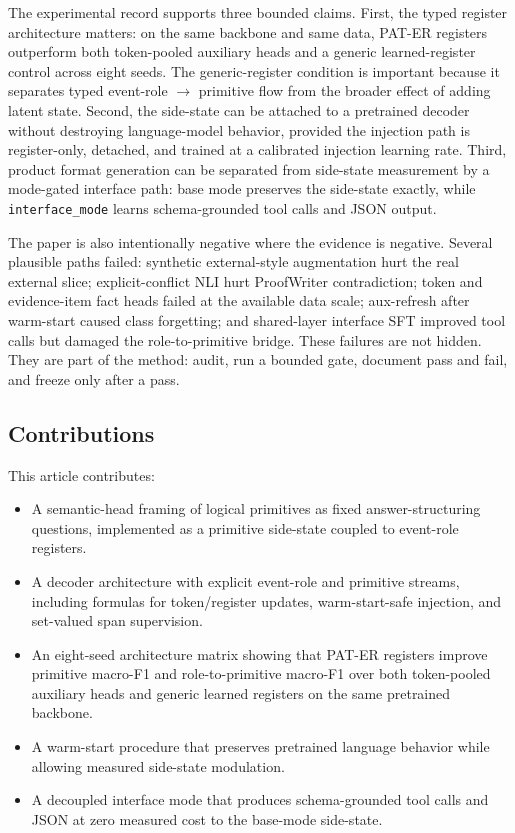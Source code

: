 The experimental record supports three bounded claims. First, the typed
register architecture matters: on the same \Qwen{} backbone and same data,
PAT-ER registers outperform both token-pooled auxiliary heads and a generic
learned-register control across eight seeds. The generic-register condition is
important because it separates typed event-role $\rightarrow$ primitive flow
from the broader effect of adding latent state. Second, the side-state can be
attached to a pretrained decoder without destroying language-model behavior,
provided the injection path is register-only, detached, and trained at a
calibrated injection learning rate. Third, product format generation can be
separated from side-state measurement by a mode-gated interface path: base mode
preserves the side-state exactly, while \texttt{interface\_mode} learns
schema-grounded tool calls and JSON output.

The paper is also intentionally negative where the evidence is negative. Several
plausible paths failed: synthetic external-style augmentation hurt the real
external slice; explicit-conflict NLI hurt ProofWriter contradiction; token and
evidence-item fact heads failed at the available data scale; aux-refresh after
warm-start caused class forgetting; and shared-layer interface SFT improved tool
calls but damaged the role-to-primitive bridge. These failures are not hidden.
They are part of the method: audit, run a bounded gate, document pass and fail,
and freeze only after a pass.



\subsection{Contributions}
\label{subsec:contributions}

This article contributes:

\begin{itemize}
  \item A semantic-head framing of logical primitives as fixed answer-structuring
  questions, implemented as a primitive side-state coupled to event-role
  registers.
  \item A decoder architecture with explicit event-role and primitive streams,
  including formulas for token/register updates, warm-start-safe injection, and
  set-valued span supervision.
  \item An eight-seed architecture matrix showing that PAT-ER registers improve
  primitive macro-F1 and role-to-primitive macro-F1 over both token-pooled
  auxiliary heads and generic learned registers on the same pretrained
  backbone.
  \item A warm-start procedure that preserves pretrained language behavior while
  allowing measured side-state modulation.
  \item A decoupled interface mode that produces schema-grounded tool calls and
  JSON at zero measured cost to the base-mode side-state.
\end{itemize}

